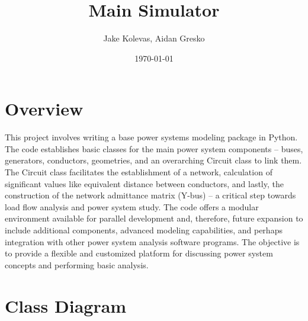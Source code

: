 \documentclass{article}
\author{Jake Kolevas, Aidan Gresko}
\title{Main Simulator}
\date{\today}
\begin{document}
	\maketitle
	
	\section{Overview}
	This project involves writing a base power systems modeling package in Python. The code establishes basic classes for the main power system components – buses, generators, conductors, geometries, and an overarching Circuit class to link them. The Circuit class facilitates the establishment of a network, calculation of significant values like equivalent distance between conductors, and lastly, the construction of the network admittance matrix (Y-bus) – a critical step towards load flow analysis and power system study. The code offers a modular environment available for parallel development and, therefore, future expansion to include additional components, advanced modeling capabilities, and perhaps integration with other power system analysis software programs. The objective is to provide a flexible and customized platform for discussing power system concepts and performing basic analysis.
	
	\section{Class Diagram}
	
\end{document}
